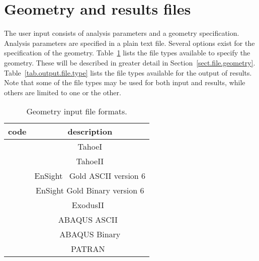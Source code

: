 \section{Geometry and results files}
\label{sect.files}
The user input consists of analysis parameters
and a geometry specification. 
Analysis parameters are specified in a plain text file. Several 
options exist for the specification of the geometry.
Table~\ref{tab.input.file.type} lists the
file types available to specify the geometry.
These will be described in greater detail in 
Section~\ref{sect.file.geometry}.
Table~\ref{tab.output.file.type} lists the
file types available for the output of results.
Note that some of the file types may be used for both
input and results, while others are limited to one or the other.
\begin{table}[h]
\caption{\label{tab.input.file.type} Geometry input file formats.}
\begin{center}
\begin{tabular}[c]{|c|c|}
\hline
 \parbox[b]{0.75in}{\centering \textbf{code}}
&\parbox[b]{2.0in}{\raggedright \textbf{description}}\\
\hline
\parbox[b]{0.75in}{} & 
\parbox[b]{2.0in}{\raggedright TahoeI}\\
\hline
\parbox[b]{0.75in}{}  & 
\parbox[b]{2.0in}{\raggedright TahoeII}\\
\hline
\parbox[c]{0.75in}{}  & 
\parbox[c]{2.0in}{\raggedright \vspace{2pt} \textsf{EnSight}~\cite{EnSight6} Gold ASCII 
version 6 \vspace{2pt}}\\
\hline
\parbox[c]{0.75in}{}  & 
\parbox[c]{2.0in}{\raggedright \vspace{2pt} \textsf{EnSight} Gold 
Binary version 6 \vspace{2pt}}\\
\hline
\parbox[b]{0.75in}{}  & 
\parbox[b]{2.0in}{\raggedright \textsf{ExodusII}~\cite{ExodusII}}\\
\hline
\parbox[b]{0.75in}{}  & 
\parbox[b]{2.0in}{\raggedright \textsf{ABAQUS ASCII}~\cite{ABAQUS62}}\\
\hline
\parbox[b]{0.75in}{}  & 
\parbox[b]{2.0in}{\raggedright \textsf{ABAQUS Binary}}\\
\hline
\parbox[b]{0.75in}{}  & 
\parbox[b]{2.0in}{\raggedright \textsf{PATRAN}~\cite{PATRAN2001}}\\
\hline
\end{tabular}
\end{center}
\end{table}
